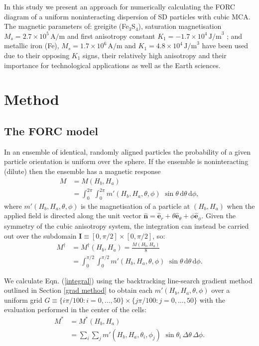 In this study we present an approach for numerically calculating the FORC diagram of a uniform noninteracting dispersion of SD particles with cubic MCA. The magnetic parameters of: greigite (Fe$_3$S$_4$), saturation magnetisation $M_s=2.7\times 10^5 \, \text{A/m}$ \citep{Li2014} and first anisotropy constant $K_1=-1.7\times 10^4 \, \text{J/m}^3$ \citep{Winklhofer2014}; and metallic iron (Fe), $M_s=1.7\times 10^6 \, \text{A/m}$ \citep{Dunlop} and $K_1=4.8\times 10^4 \, \text{J/m}^3$ \citep{Graham1958} have been used due to their opposing $K_1$ signs, their relatively high anisotropy and their importance for technological applications as well as the Earth sciences.\par

\section{Method}
\subsection{The FORC model}
In an ensemble of identical, randomly aligned particles the probability of a given particle orientation is uniform over the sphere. If the ensemble is noninteracting (dilute) then the ensemble has a magnetic response
\begin{align}
M &= M(H_b, H_a) \nonumber \\
  &= {\int^{2\pi}_{0}}{\int^{2\pi}_{0}} m'(H_b, H_a, \theta, \phi)\,\,\sin\theta\,\text{d}\theta\,\text{d}\phi,
\end{align}
where $m'(H_b, H_a, \theta, \phi)$ is the magnetisation of a particle at $(H_b, H_a)$ when the applied field is directed along the unit vector $\boldsymbol{\hat{n}} = \boldsymbol{\hat{e}}_r + \theta\boldsymbol{\hat{e}}_\theta + \phi\boldsymbol{\hat{e}}_\phi$. Given the symmetry of the cubic anisotropy system, the integration can instead be carried out over the subdomain $\mathbf{I} \equiv [0, \pi/2] \times [0, \pi/2]$, so:
\begin{align}\label{integral}
M^{\dagger} &= M^{\dagger}(H_b, H_a) = \frac{M(H_b, H_a)}{8} \nonumber \\
            &= {\int^{\pi/2}_{0}}{\int^{\pi/2}_{0}} m'(H_b, H_a, \theta, \phi)\,\,\sin\theta\,\text{d}\theta\,\text{d}\phi.
\end{align}
\par

We calculate Eqn. (\ref{integral}) using the backtracking line-search gradient method outlined in Section \ref{grad method} to obtain each $m'(H_b, H_a, \theta, \phi)$ over a uniform grid $G \equiv \{i\pi/100: i=0,\ldots,50 \} \times \{j\pi/100: j=0,\ldots,50 \}$ with the evaluation performed in the center of the cells:
\begin{align}
M^{*} &= M^{*}(H_b, H_a) \nonumber \\
      &= {\sum_{i}}{\sum_{j}} m'(H_b, H_a, \theta_i, \phi_j)\,\,\sin\theta_i\,\Delta\theta\,\Delta\phi.
\end{align}
\par

